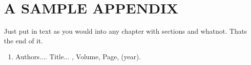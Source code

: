 \documentclass[BTech]{iitmdiss}
\begin{document}

\appendix

\chapter{A SAMPLE APPENDIX}

Just put in text as you would into any chapter with sections and
whatnot.  Thats the end of it.


\begin{singlespace}
  
\end{singlespace}



\listofpapers

\begin{enumerate}  
\item Authors....  \newblock
 Title...
  , Volume,
  Page, (year).
\end{enumerate}  
\end{document}
